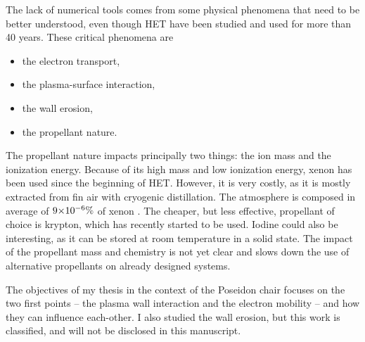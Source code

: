 The lack of numerical tools comes from some physical phenomena that need to be better understood, even though \ac{HET} have been studied and used for more than 40 years.
These critical phenomena are \citep{samukawa2012,adamovich2017}
\begin{itemize}
  \item the electron transport,
  \item the plasma-surface interaction,
  \item the wall erosion,
  \item the propellant nature.
\end{itemize}

\vspace{1em}
The propellant nature impacts principally two things\string: the ion mass and the ionization energy.
Because of its high mass and low ionization energy, xenon has been used since the beginning of \ac{HET}. 
However, it is very costly, as it is mostly extracted from fin air with cryogenic distillation.
The atmosphere is composed in average of ${{9}{\times}10^{-6}}\%$ of xenon \citep{earthfacs}.
The cheaper, but less effective, propellant of choice is krypton, which has recently started to be used.
Iodine could also be interesting, as it can be stored at room temperature in a solid state.
The impact of the propellant mass and chemistry is not yet clear and slows down the use of alternative propellants on already designed systems.

\vspace{1em}
The objectives of my thesis in the context of the {\sc Poseidon} chair focuses on the two first points -- the plasma wall interaction and the electron mobility -- and how they can influence each-other.
I also studied the wall erosion, but this work is classified, and will not be disclosed in this manuscript.





